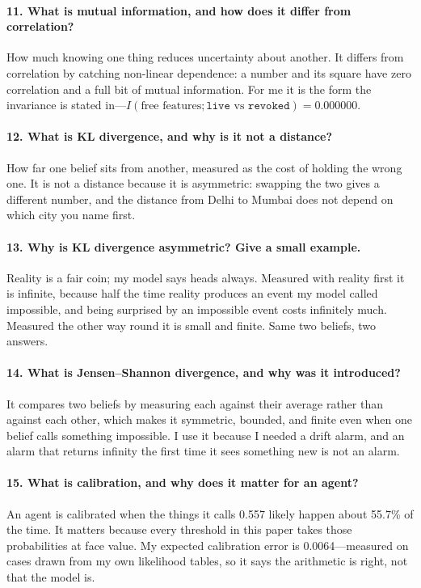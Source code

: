 \documentclass{article}
\begin{document}
\paragraph{11. What is mutual information, and how does it differ from correlation?}
How much knowing one thing reduces uncertainty about another. It differs from
correlation by catching non-linear dependence: a number and its square have zero
correlation and a full bit of mutual information. For me it is the form the
invariance is stated in---$I(\text{free features}; \texttt{live} \text{ vs }
\texttt{revoked}) = 0.000000$.

\paragraph{12. What is KL divergence, and why is it not a distance?}
How far one belief sits from another, measured as the cost of holding the wrong
one. It is not a distance because it is asymmetric: swapping the two gives a
different number, and the distance from Delhi to Mumbai does not depend on which
city you name first.

\paragraph{13. Why is KL divergence asymmetric? Give a small example.}
Reality is a fair coin; my model says heads always. Measured with reality first it
is infinite, because half the time reality produces an event my model called
impossible, and being surprised by an impossible event costs infinitely much.
Measured the other way round it is small and finite. Same two beliefs, two
answers.

\paragraph{14. What is Jensen--Shannon divergence, and why was it introduced?}
It compares two beliefs by measuring each against their average rather than
against each other, which makes it symmetric, bounded, and finite even when one
belief calls something impossible. I use it because I needed a drift alarm, and an
alarm that returns infinity the first time it sees something new is not an alarm.

\paragraph{15. What is calibration, and why does it matter for an agent?}
An agent is calibrated when the things it calls 0.557 likely happen about 55.7\%
of the time. It matters because every threshold in this paper takes those
probabilities at face value. My expected calibration error is 0.0064---measured on
cases drawn from my own likelihood tables, so it says the arithmetic is right, not
that the model is.
\end{document}
